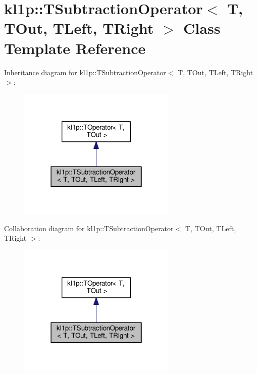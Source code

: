 \hypertarget{classkl1p_1_1TSubtractionOperator}{}\section{kl1p\+:\+:T\+Subtraction\+Operator$<$ T, T\+Out, T\+Left, T\+Right $>$ Class Template Reference}
\label{classkl1p_1_1TSubtractionOperator}


Inheritance diagram for kl1p\+:\+:T\+Subtraction\+Operator$<$ T, T\+Out, T\+Left, T\+Right $>$\+:
\nopagebreak
\begin{figure}[H]
\begin{center}
\leavevmode
\includegraphics[width=214pt]{classkl1p_1_1TSubtractionOperator__inherit__graph}
\end{center}
\end{figure}


Collaboration diagram for kl1p\+:\+:T\+Subtraction\+Operator$<$ T, T\+Out, T\+Left, T\+Right $>$\+:
\nopagebreak
\begin{figure}[H]
\begin{center}
\leavevmode
\includegraphics[width=214pt]{classkl1p_1_1TSubtractionOperator__coll__graph}
\end{center}
\end{figure}
